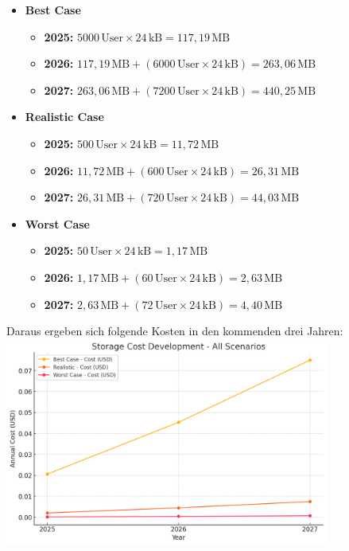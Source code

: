 \begin{itemize}
    \item \textbf{Best Case}
    \begin{itemize}
        \item \textbf{2025:} \(5000 \, \text{User} \times 24 \, \text{kB} = 117,19 \, \text{MB}\)
        \item \textbf{2026:} \(117,19 \, \text{MB} + (6000 \, \text{User} \times 24 \, \text{kB}) = 263,06 \, \text{MB}\)
        \item \textbf{2027:} \(263,06 \, \text{MB} + (7200 \, \text{User} \times 24 \, \text{kB}) = 440,25 \, \text{MB}\)
    \end{itemize}

    \item \textbf{Realistic Case}
    \begin{itemize}
        \item \textbf{2025:} \(500 \, \text{User} \times 24 \, \text{kB} = 11,72 \, \text{MB}\)
        \item \textbf{2026:} \(11,72 \, \text{MB} + (600 \, \text{User} \times 24 \, \text{kB}) = 26,31 \, \text{MB}\)
        \item \textbf{2027:} \(26,31 \, \text{MB} + (720 \, \text{User} \times 24 \, \text{kB}) = 44,03 \, \text{MB}\)
    \end{itemize}

    \item \textbf{Worst Case}
    \begin{itemize}
        \item \textbf{2025:} \(50 \, \text{User} \times 24 \, \text{kB} = 1,17 \, \text{MB}\)
        \item \textbf{2026:} \(1,17 \, \text{MB} + (60 \, \text{User} \times 24 \, \text{kB}) = 2,63 \, \text{MB}\)
        \item \textbf{2027:} \(2,63 \, \text{MB} + (72 \, \text{User} \times 24 \, \text{kB}) = 4,40 \, \text{MB}\)
    \end{itemize}
\end{itemize}

Daraus ergeben sich folgende Kosten in den kommenden drei Jahren:
\includegraphics[width=0.8\textwidth]{abbildungen/Kosten_Speicher_Text}

